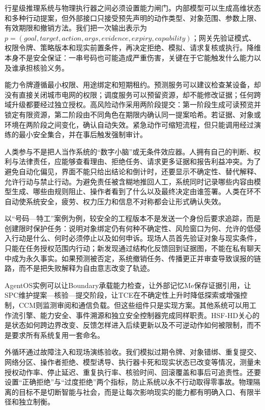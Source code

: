 行星级推理系统与物理执行器之间必须设置能力闸门。内部模型可以生成高维状态和多种行动提案，但外部接口只接受预先声明的动作类型、对象范围、参数上限、有效期限和撤销方法。我们把一次输出表示为 $p=(goal,target,action,args,evidence,expiry,capability)$；网关先验证模式、权限令牌、策略版本和现实前置条件，再决定拒绝、模拟、请求复核或执行。降维本身不是安全保证：一串号码也可能造成严重伤害，关键在于它能触发什么能力以及谁承担核验义务。

能力令牌遵循最小权限、用途绑定和短期租约。预测服务可以建议检查某设备，却没有直接关闭城市电网的权限；调度服务可以预留资源，却不能修改证据；任何跨域升级都要经过独立授权。高风险动作采用两阶段提交：第一阶段生成可读预览并锁定有限资源，第二阶段由不同角色在期限内确认同一提案哈希。若证据、对象或环境在两阶段之间变化，确认自动失效。紧急动作可缩短流程，但只能调用经过演练的最小安全集合，并在事后触发强制审计。

人类参与不是把人当作系统的“数字小脑”或无条件效应器。人拥有自己的判断、权利与法律责任，应能够查看理由、拒绝任务、请求更多证据和报告利益冲突。为了避免自动化偏见，界面不能只给出结论和倒计时，还要显示不确定性、替代解释、允许行动与禁止行动。为避免责任被含糊地推回人工，系统同时记录哪些内容由模型生成、哪些由规则阻止、操作者看到了什么以及最终决定由谁签署。人类在环不自动使系统安全，疲劳、权力压力和信息不对称都会让形式确认失效。

以“号码—特工”案例为例，较安全的工程版本不是发送一个身份后要求追踪，而是创建限时保护任务：说明对象绑定仍有何种不确定性、风险窗口为何、允许的低侵入行动是什么、何时必须停止以及如何申诉。现场人员首先验证对象与现实条件，只能在任务授权范围内行动；新发现通过结构化反馈回到证据图，不能在私有聊天中成为永久事实。如果预测被否定，系统撤销任务、传播更正并审查导致误报的链路，而不是把失败解释为自由意志改变了轨迹。

AgentOS实例可以让Boundary承载能力检查，让外部记忆Me保存证据引用，让SPC维护提案—核验—提交阶段，让TCE在不确定性上升时降低探索或增强控制，CCM则监测审阅和通信负载。但这些组件只是实现方案。其他系统可以用工作流引擎、能力安全、事件溯源和独立安全控制器完成同样职责。HSF-HD关心的是状态如何跨边界改变、反馈怎样进入后续更新以及不可逆动作如何被限制，而不是要求所有系统复用一套命名。

外循环通过故障注入和现场演练验收。我们模拟过期令牌、对象错绑、重复提交、网络分区、操作者拒绝、模型诱导、执行器卡死和现实状态已改变等情况，测量未授权动作率、停止延迟、重复执行率、核验时间、回滚覆盖和事后可追责性。还要设置“正确拒绝”与“过度拒绝”两个指标，防止系统以永不行动取得零事故。物理隔离的目标不是切断智能与社会，而是让每次影响现实的能力都有明确入口、有限半径和独立制衡。

